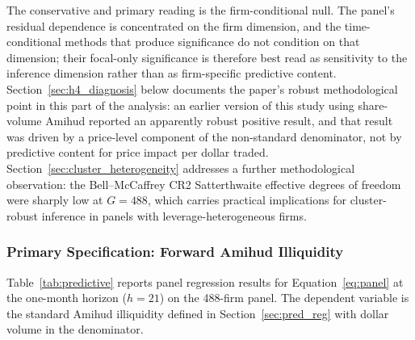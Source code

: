\documentclass[preprint,12pt,authoryear]{elsarticle}
\begin{document}
The conservative and primary reading is the firm-conditional null. The panel's residual dependence is concentrated on the firm dimension, and the time-conditional methods that produce significance do not condition on that dimension; their focal-only significance is therefore best read as sensitivity to the inference dimension rather than as firm-specific predictive content. Section~\ref{sec:h4_diagnosis} below documents the paper's robust methodological point in this part of the analysis: an earlier version of this study using share-volume Amihud reported an apparently robust positive result, and that result was driven by a price-level component of the non-standard denominator, not by predictive content for price impact per dollar traded. Section~\ref{sec:cluster_heterogeneity} addresses a further methodological observation: the Bell--McCaffrey CR2 Satterthwaite effective degrees of freedom were sharply low at $G = 488$, which carries practical implications for cluster-robust inference in panels with leverage-heterogeneous firms.

\subsubsection{Primary Specification: Forward Amihud Illiquidity}

Table~\ref{tab:predictive} reports panel regression results for Equation~\eqref{eq:panel} at the one-month horizon ($h = 21$) on the 488-firm panel. The dependent variable is the standard Amihud illiquidity defined in Section~\ref{sec:pred_reg} with dollar volume in the denominator.
\end{document}
